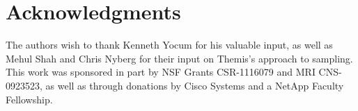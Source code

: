 \section{Acknowledgments}
\label{sec:ack}

The authors wish to thank Kenneth Yocum for his valuable input, as well as
Mehul Shah and Chris Nyberg for their input on Themis's approach to
sampling.  This work was sponsored in part by NSF Grants CSR-1116079 and MRI
CNS-0923523, as well as through donations by Cisco Systems and a NetApp Faculty
Fellowship.


